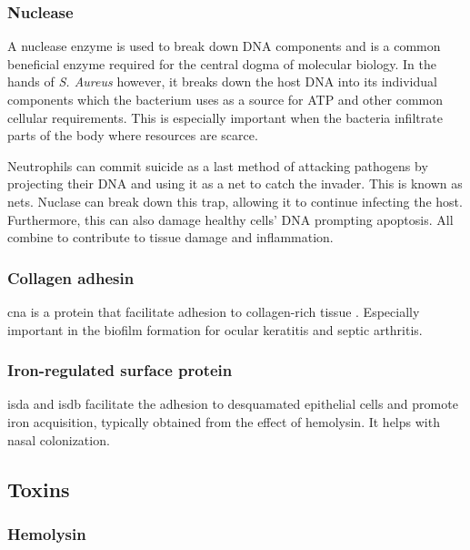 \subsubsection{Nuclease}

\label{staphNuclease}

A nuclease enzyme is used to break down DNA components and is a common beneficial enzyme required for the central dogma of molecular biology. In the hands of \textit{S. Aureus} however, it breaks down the host DNA into its individual components which the bacterium uses as a source for ATP and other common cellular requirements. This is especially important when the bacteria infiltrate parts of the body where resources are scarce.

Neutrophils can commit suicide as a last method of attacking pathogens by projecting their DNA and using it as a net to catch the invader. This is known as \gls{nets}. Nuclase can break down this trap, allowing it to continue infecting the host. Furthermore, this can also damage healthy cells' DNA prompting apoptosis. All combine to contribute to tissue damage and inflammation.

\subsubsection{Collagen adhesin}

\gls{cna} is a protein that facilitate adhesion to collagen-rich tissue \cite{Patti1994} \cite{MURUGAN2010}. Especially important in the biofilm formation for ocular keratitis and septic arthritis.

\subsubsection{Iron-regulated surface protein}

\gls{isda} and \gls{isdb} facilitate the adhesion to desquamated epithelial cells and promote iron acquisition, typically obtained from the effect of hemolysin. It helps with nasal colonization. \cite{Foster2013} \cite{Cheng2009}

\subsection{Toxins}

\subsubsection{Hemolysin}

